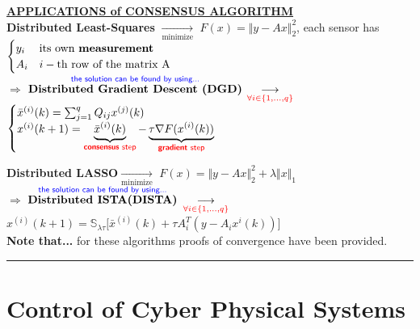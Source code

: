 \documentclass[a4paper, 12pt]{article}
\begin{document}
\noindent
{\underline{\normalsize\textbf{APPLICATIONS of CONSENSUS ALGORITHM}}}\\
\textbf{\textsf{Distributed Least-Squares}} $\underset{\text{minimize}}{\longrightarrow}$ $F(x)=\Vert y-Ax \Vert_2^2$, each sensor has $\begin{cases}
    y_i & \text{its own \textbf{measurement}}\\
    A_i & i-\text{th row of the matrix A}
\end{cases}$ \\
$\Longrightarrow$ 
$\overset{\textsf{\color{blue}the solution can be found by using...}}{\textbf{Distributed Gradient Descent (DGD)}}$
    $\underset{\color{red}\forall i\in\{1,...,q\}}{\longrightarrow}$
  $ \begin{cases}
    \bar{x}^{(i)}(k)=\sum_{j=1}^{q} Q_{ij}x^{(j)}(k) \\
    x^{(i)}(k+1)=\underbrace{\bar{x}^{(i)}(k)}_\textsf{\color{red} \textbf{consensus} step}-\underbrace{\tau\nabla F(x^{(i)}(k))}_\textsf{\color{red}\textbf{gradient} step}
\end{cases}$

\noindent
\textbf{\textsf{Distributed LASSO}}$\underset{\text{minimize}}{\longrightarrow}$ $F(x)=\Vert y-Ax \Vert_2^2 + \lambda \Vert x \Vert_1$\\
$\Longrightarrow$ 
$\overset{\textsf{\color{blue}the solution can be found by using...}}{\textbf{Distributed ISTA(DISTA)}}$
$\underset{\color{red}\forall i\in\{1,...,q\}}{\longrightarrow}$
{\large{
    $x^{(i)}(k+1)=\mathbb{S}_{\lambda\tau}\big[ 
        \bar{x}^{(i)}(k) +
        \tau A_i^T(y-A_ix^{i}(k))    
    \big]$
}}\\

\noindent
{\small{
    \textbf{Note that...} for these algorithms proofs of convergence have been provided.
}}

\begin{center}
    \rule{300pt}{.2pt}
    \vspace{-1ex}
\end{center}


\section{Control of Cyber Physical Systems}
\end{document}
